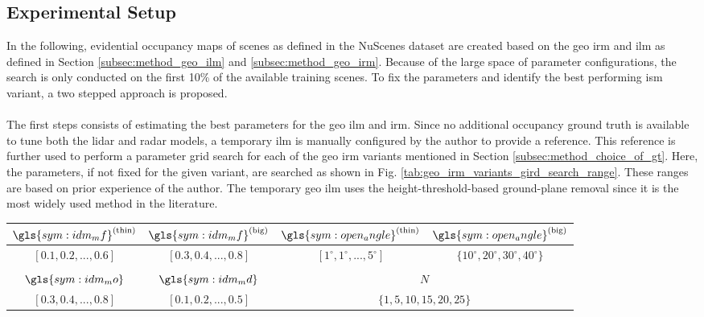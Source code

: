 \subsection{Experimental Setup}
\label{subsec:exp_setup_gt}
In the following, evidential occupancy maps of scenes as defined in the NuScenes dataset are created based on the geo \gls{irm} and \gls{ilm} as defined in Section \ref{subsec:method_geo_ilm} and \ref{subsec:method_geo_irm}. Because of the large space of parameter configurations, the search is only conducted on the first 10\% of the available training scenes. To fix the parameters and identify the best performing \gls{ism} variant, a two stepped approach is proposed.
\\\\
The first steps consists of estimating the best parameters for the geo \gls{ilm} and \gls{irm}. Since no additional occupancy ground truth is available to tune both the lidar and radar models, a temporary \gls{ilm} is manually configured by the author to provide a reference. This reference is further used to perform a parameter grid search for each of the geo \gls{irm} variants mentioned in Section \ref{subsec:method_choice_of_gt}. Here, the parameters, if not fixed for the given variant, are searched as shown in Fig. \ref{tab:geo_irm_variants_gird_search_range}. These ranges are based on prior experience of the author. The temporary geo \gls{ilm} uses the height-threshold-based ground-plane removal since it is the most widely used method in the literature.
\begin{center}
	\begin{tabular}{c|c|c|c}
		$\gls{sym:idm_mf}^{(\text{thin})}$ & $\gls{sym:idm_mf}^{(\text{big})}$ & $\gls{sym:open_angle}^{(\text{\scriptsize thin})}$ & $\gls{sym:open_angle}^{(\text{\scriptsize big})}$\\
		\hline
		$[0.1,0.2,...,0.6]$ & $[0.3,0.4,...,0.8]$ & $[1^{\circ},1^{\circ},...,5^{\circ}]$ & $\{10^{\circ}, 20^{\circ},30^{\circ},40^{\circ}\}$\\
		\multicolumn{4}{c}{}\\
		$\gls{sym:idm_mo}$ & $\gls{sym:idm_md}$ & \multicolumn{2}{c}{$N$}\\
		\hline
		$[0.3, 0.4, ..., 0.8]$ & $[0.1, 0.2, ..., 0.5]$ & \multicolumn{2}{c}{$\{1,5,10,15,20,25\}$}
	\end{tabular}
\end{center}
